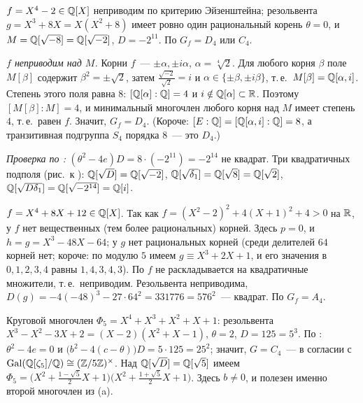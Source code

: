 \begin{example}[4.13]
$f=X^4-2\in\mathbb Q[X]$ неприводим по критерию Эйзенштейна; резольвента $g=X^3+8X=X(X^2+8)$ имеет ровно один рациональный
корень $\theta=0$, и $M=\mathbb Q[\sqrt{-8}]=\mathbb Q[\sqrt{-2}]$, $D=-2^{11}$. По  $G_f=D_4$ или $C_4$.

\emph{$f$ неприводим над $M$.} Корни $f$~--- $\pm\alpha,\pm i\alpha$, $\alpha=\sqrt[4]2$. Для любого корня $\beta$ поле $M[\beta]$ содержит $\beta^2=\pm\sqrt2$,
затем $\frac{\sqrt{-2}}{\sqrt2}=i$ и $\alpha\in\{\pm\beta,\pm i\beta\}$, т.\,е.\ $M[\beta]=\mathbb Q[\alpha,i]$. Степень этого поля равна $8$: $[\mathbb Q[\alpha]:\mathbb Q]=4$ и
$i\notin\mathbb Q[\alpha]\subset\mathbb R$. Поэтому $[M[\beta]:M]=4$, и минимальный многочлен любого корня над $M$ имеет степень $4$, т.\,е.\ равен $f$.
Значит, $G_f=D_4$. (Короче: $[E:\mathbb Q]=[\mathbb Q[\alpha,i]:\mathbb Q]=8$, а транзитивная подгруппа $S_4$ порядка $8$~--- это $D_4$.)

\emph{Проверка по :} $(\theta^2-4e)D=8\cdot(-2^{11})=-2^{14}$ не квадрат. Три квадратичных подполя (рис.\ к ):
$\mathbb Q[\sqrt D]=\mathbb Q[\sqrt{-2}]$, $\mathbb Q[\sqrt{\delta_1}]=\mathbb Q[\sqrt8]=\mathbb Q[\sqrt2]$, $\mathbb Q[\sqrt{D\delta_1}]=\mathbb Q[\sqrt{-2^{14}}]=\mathbb Q[i]$.
\end{example}

\begin{example}[4.13a]
$f=X^4+8X+12\in\mathbb Q[X]$. Так как $f=(X^2-2)^2+4(X+1)^2+4>0$ на $\mathbb R$, у $f$ нет вещественных (тем более рациональных) корней.
Здесь $p=0$, и $h=g=X^3-48X-64$; у $g$ нет рациональных корней (среди делителей $64$ корней нет; короче: по модулю $5$ имеем
$g\equiv X^3+2X+1$, и его значения в $0,1,2,3,4$ равны $1,4,3,4,3$). По  $f$ не
раскладывается на квадратичные множители, т.\,е.\ неприводим. Резольвента неприводима, $D(g)=-4(-48)^3-27\cdot64^2=331776=576^2$~---
квадрат. По  $G_f=A_4$.
\end{example}

\begin{example}[4.13b]
Круговой многочлен $\Phi_5=X^4+X^3+X^2+X+1$: резольвента $X^3-X^2-3X+2=(X-2)(X^2+X-1)$, $\theta=2$, $D=125=5^3$. По :
$\theta^2-4e=0$ и $\bigl(b^2-4(c-\theta)\bigr)D=5\cdot125=25^2$; значит, $G=C_4$~--- в согласии с $\operatorname{Gal}(\mathbb Q[\zeta_5]/\mathbb Q)\cong(\mathbb Z/5\mathbb Z)^\times$. Над
$\mathbb Q[\sqrt D]=\mathbb Q[\sqrt5]$ имеем $\Phi_5=\bigl(X^2+\frac{1-\sqrt5}2X+1\bigr)\bigl(X^2+\frac{1+\sqrt5}2X+1\bigr)$. Здесь $b\ne0$, и полезен именно второй
многочлен из (a).
\end{example}

